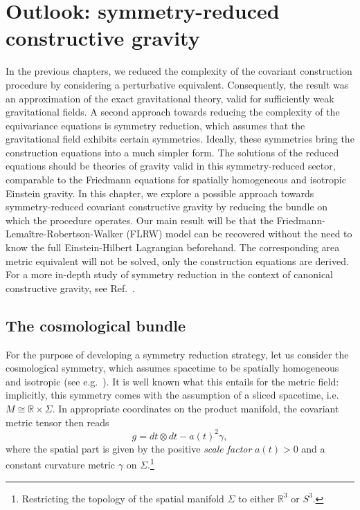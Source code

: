 \chapter{Outlook: symmetry-reduced constructive gravity}\label{chapter_cosmo}

In the previous chapters, we reduced the complexity of the covariant construction procedure by considering a perturbative equivalent. Consequently, the result was an approximation of the exact gravitational theory, valid for sufficiently weak gravitational fields. A second approach towards reducing the complexity of the equivariance equations is symmetry reduction, which assumes that the gravitational field exhibits certain symmetries. Ideally, these symmetries bring the construction equations into a much simpler form. The solutions of the reduced equations should be theories of gravity valid in this symmetry-reduced sector, comparable to the Friedmann equations for spatially homogeneous and isotropic Einstein gravity. In this chapter, we explore a possible approach towards symmetry-reduced covariant constructive gravity by reducing the bundle on which the procedure operates. Our main result will be that the Friedmann-Lema\^itre-Robertson-Walker (FLRW) model can be recovered without the need to know the full Einstein-Hilbert Lagrangian beforehand. The corresponding area metric equivalent will not be solved, only the construction equations are derived. For a more in-depth study of symmetry reduction in the context of canonical constructive gravity, see Ref.\ \cite{Duell_2020}.

\section{The cosmological bundle}
For the purpose of developing a symmetry reduction strategy, let us consider the cosmological symmetry, which assumes spacetime to be spatially homogeneous and isotropic (see e.g.\ \cite{Weinberg_1972,Wald_1984}). It is well known what this entails for the metric field: implicitly, this symmetry comes with the assumption of a sliced spacetime, i.e.\ $M \cong \mathbb R \times \Sigma$. In appropriate coordinates on the product manifold, the covariant metric tensor then reads \cite{Weinberg_1972,Katanaev_2016}
\begin{equation}
  g = dt \otimes dt - a(t)^2 \gamma,
\end{equation}
where the spatial part is given by the positive \emph{scale factor} $a(t) > 0$ and a constant curvature metric $\gamma$ on $\Sigma$.\footnote{Restricting the topology of the spatial manifold $\Sigma$ to either $\mathbb R^3$ or $S^3$.}

